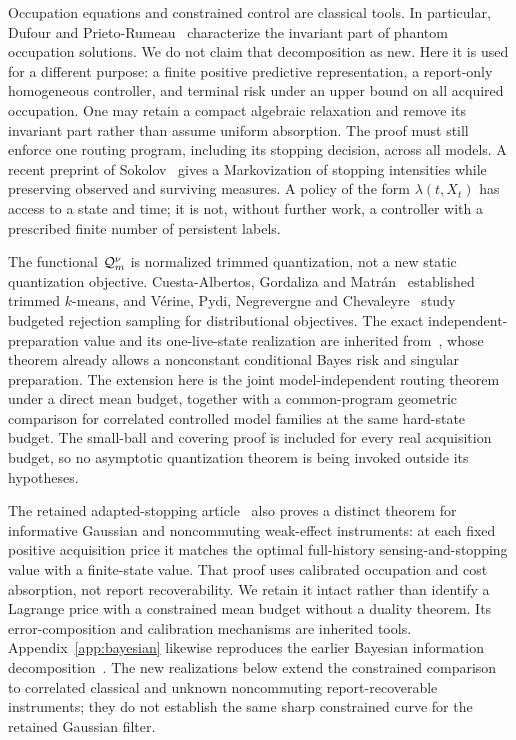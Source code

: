 Occupation equations and constrained control are classical tools. In particular, Dufour and Prieto-Rumeau~\cite{DPR} characterize the invariant part of phantom occupation solutions. We do not claim that decomposition as new. Here it is used for a different purpose: a finite positive predictive representation, a report-only homogeneous controller, and terminal risk under an upper bound on all acquired occupation. One may retain a compact algebraic relaxation and remove its invariant part rather than assume uniform absorption. The proof must still enforce one routing program, including its stopping decision, across all models. A recent preprint of Sokolov~\cite{Sokolov} gives a Markovization of stopping intensities while preserving observed and surviving measures. A policy of the form $\lambda(t,X_t)$ has access to a state and time; it is not, without further work, a controller with a prescribed finite number of persistent labels.

The functional $\mathcal Q_m^\nu$ is normalized trimmed quantization, not a new static quantization objective. Cuesta-Albertos, Gordaliza and Matr\'an~\cite{CGM} established trimmed $k$-means, and V\'erine, Pydi, Negrevergne and Chevaleyre~\cite{VPNC} study budgeted rejection sampling for distributional objectives. The exact independent-preparation value and its one-live-state realization are inherited from~\cite{GTFStopped}, whose theorem already allows a nonconstant conditional Bayes risk and singular preparation. The extension here is the joint model-independent routing theorem under a direct mean budget, together with a common-program geometric comparison for correlated controlled model families at the same hard-state budget. The small-ball and covering proof is included for every real acquisition budget, so no asymptotic quantization theorem is being invoked outside its hypotheses.

The retained adapted-stopping article~\cite{GTFStopped} also proves a distinct theorem for informative Gaussian and noncommuting weak-effect instruments: at each fixed positive acquisition price it matches the optimal full-history sensing-and-stopping value with a finite-state value. That proof uses calibrated occupation and cost absorption, not report recoverability. We retain it intact rather than identify a Lagrange price with a constrained mean budget without a duality theorem. Its error-composition and calibration mechanisms are inherited tools. Appendix~\ref{app:bayesian} likewise reproduces the earlier Bayesian information decomposition~\cite{GTFBayes}. The new realizations below extend the constrained comparison to correlated classical and unknown noncommuting report-recoverable instruments; they do not establish the same sharp constrained curve for the retained Gaussian filter.

